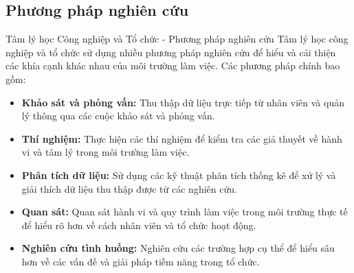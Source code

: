 \documentclass[../main.tex]{subfiles}
\begin{document}
\subsection{Phương pháp nghiên cứu}
\begin{frame}{Tâm lý học Công nghiệp và Tổ chức - Phương pháp nghiên cứu}
    Tâm lý học công nghiệp và tổ chức sử dụng nhiều phương pháp nghiên cứu để hiểu và cải thiện các khía cạnh khác nhau của môi trường làm việc. Các phương pháp chính bao gồm:
    \begin{itemize}
        \item \textbf{Khảo sát và phỏng vấn:} Thu thập dữ liệu trực tiếp từ nhân viên và quản lý thông qua các cuộc khảo sát và phỏng vấn.
        \item \textbf{Thí nghiệm:} Thực hiện các thí nghiệm để kiểm tra các giả thuyết về hành vi và tâm lý trong môi trường làm việc.
        \item \textbf{Phân tích dữ liệu:} Sử dụng các kỹ thuật phân tích thống kê để xử lý và giải thích dữ liệu thu thập được từ các nghiên cứu.
        \item \textbf{Quan sát:} Quan sát hành vi và quy trình làm việc trong môi trường thực tế để hiểu rõ hơn về cách nhân viên và tổ chức hoạt động.
        \item \textbf{Nghiên cứu tình huống:} Nghiên cứu các trường hợp cụ thể để hiểu sâu hơn về các vấn đề và giải pháp tiềm năng trong tổ chức.
    \end{itemize}
\end{frame}
\end{document}
